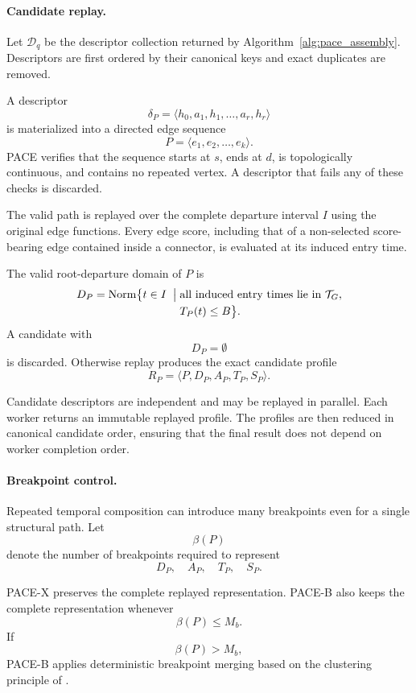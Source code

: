 \documentclass[a4paper,fleqn]{cas-dc}
\begin{document}
\paragraph{Candidate replay.}
Let \(\mathcal D_q\) be the descriptor collection returned by
Algorithm~\ref{alg:pace_assembly}. Descriptors are first ordered by their
canonical keys and exact duplicates are removed.

A descriptor
\[
\delta_P
=
\langle
h_0,a_1,h_1,\ldots,a_r,h_r
\rangle
\]
is materialized into a directed edge sequence
\[
P
=
\langle
e_1,e_2,\ldots,e_k
\rangle.
\]
PACE verifies that the sequence starts at \(s\), ends at \(d\), is
topologically continuous, and contains no repeated vertex. A descriptor that
fails any of these checks is discarded.

The valid path is replayed over the complete departure interval \(I\) using
the original edge functions. Every edge score, including that of a
non-selected score-bearing edge contained inside a connector, is evaluated at
its induced entry time.

The valid root-departure domain of \(P\) is
\[
\begin{aligned}
D_P
=
\operatorname{Norm}\bigl\{t\in I\;\bigm|\;&
\text{all induced entry times lie in }\mathcal T_G,\\[-0.2ex]
& T_P(t)\leq B
\bigr\}.
\end{aligned}
\]
A candidate with
\[
D_P=\emptyset
\]
is discarded. Otherwise replay produces the exact candidate profile
\[
R_P
=
\langle
P,D_P,A_P,T_P,S_P
\rangle.
\]

Candidate descriptors are independent and may be replayed in parallel. Each
worker returns an immutable replayed profile. The profiles are then reduced in
canonical candidate order, ensuring that the final result does not depend on
worker completion order.

\paragraph{Breakpoint control.}
Repeated temporal composition can introduce many breakpoints even for a
single structural path. Let
\[
\beta(P)
\]
denote the number of breakpoints required to represent
\[
D_P,\quad A_P,\quad T_P,\quad S_P.
\]

PACE-X preserves the complete replayed representation. PACE-B also keeps the
complete representation whenever
\[
\beta(P)\leq M_b.
\]
If
\[
\beta(P)>M_b,
\]
PACE-B applies deterministic breakpoint merging based on the clustering
principle of \cite{td-cpo-2025-interval}.
\end{document}
